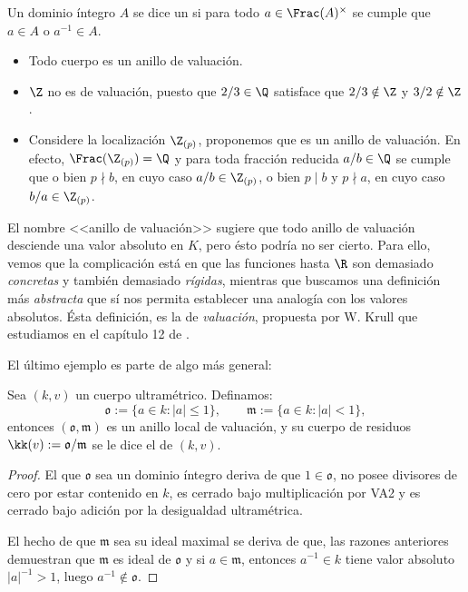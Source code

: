 \documentclass[teoria-numeros.tex]{subfiles}
\begin{document}
\begin{mydefi}
	Un dominio íntegro $A$ se dice un  si para todo $a \in \Frac(A)^\times$
	se cumple que $a \in A$ o $a^{-1} \in A$.
\end{mydefi}
\begin{ex}
	\begin{itemize}
		\item Todo cuerpo es un anillo de valuación.
		\item $\Z$ no es de valuación, puesto que $2/3 \in \Q$ satisface que $2/3 \notin \Z$ y $3/2 \notin \Z$.
		\item Considere la localización $\Z_{(p)}$, proponemos que es un anillo de valuación.
			En efecto, $\Frac( \Z_{(p)} ) = \Q$ y para toda fracción reducida $a/b \in \Q$ se cumple que o bien $p\nmid b$, en cuyo caso
			$a/b \in \Z_{(p)}$, o bien $p \mid b$ y $p \nmid a$, en cuyo caso $b/a \in \Z_{(p)}$.
	\end{itemize}
\end{ex}
El nombre <<anillo de valuación>> sugiere que todo anillo de valuación desciende una valor absoluto en $K$, pero ésto podría no ser cierto.
Para ello, vemos que la complicación está en que las funciones hasta $\R$ son demasiado \textit{concretas} y también demasiado \textit{rígidas},
mientras que buscamos una definición más \textit{abstracta} que sí nos permita establecer una analogía con los valores absolutos.
Ésta definición, es la de \textit{valuación}, propuesta por W. Krull que estudiamos en el capítulo 12 de \cite{Alg}.

El último ejemplo es parte de algo más general:
\begin{prop}
	Sea $(k, v)$ un cuerpo ultramétrico. Definamos:
	$$ \mathfrak{o} := \{ a \in k : |a| \le 1 \}, \qquad \mathfrak{m} := \{ a \in k : |a| < 1 \}, $$
	entonces $(\mathfrak{o}, \mathfrak{m})$ es un anillo local de valuación, y su cuerpo de residuos $\kk(v) := \mathfrak{o}/\mathfrak{m}$ se le dice el
	 de $(k, v)$.
\end{prop}
\begin{proof}
	El que $\mathfrak{o}$ sea un dominio íntegro deriva de que $1 \in \mathfrak{o}$, no posee divisores de cero por estar contenido en $k$,
	es cerrado bajo multiplicación por VA2 y es cerrado bajo adición por la desigualdad ultramétrica.

	El hecho de que $\mathfrak{m}$ sea su ideal maximal se deriva de que, las razones anteriores demuestran que $\mathfrak{m}$ es ideal de $\mathfrak{o}$
	y si $a \in \mathfrak{m}$, entonces $a^{-1} \in k$ tiene valor absoluto $|a|^{-1} > 1$, luego $a^{-1} \notin \mathfrak{o}$.
\end{proof}
\end{document}
